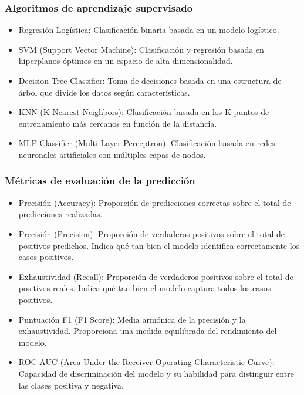 \documentclass{beamer}
\begin{document}
\begin{frame}
	\frametitle{Algoritmos de aprendizaje supervisado}
	
	\begin{itemize}
		\item Regresión Logística: Clasificación binaria basada en un modelo logístico.
		\item SVM (Support Vector Machine): Clasificación y regresión basada en hiperplanos óptimos en un espacio de alta dimensionalidad.
		\item Decision Tree Classifier: Toma de decisiones basada en una estructura de árbol que divide los datos según características.
		\item KNN (K-Nearest Neighbors): Clasificación basada en los K puntos de entrenamiento más cercanos en función de la distancia.
		\item MLP Classifier (Multi-Layer Perceptron): Clasificación basada en redes neuronales artificiales con múltiples capas de nodos.
	\end{itemize}
	
\end{frame}


\begin{frame}
	\frametitle{Métricas de evaluación de la predicción}
	\begin{itemize}
		\item Precisión (Accuracy): Proporción de predicciones correctas sobre el total de predicciones realizadas.
		\item Precisión (Precision): Proporción de verdaderos positivos sobre el total de positivos predichos. Indica qué tan bien el modelo identifica correctamente los casos positivos.
		\item Exhaustividad (Recall): Proporción de verdaderos positivos sobre el total de positivos reales. Indica qué tan bien el modelo captura todos los casos positivos.
		\item Puntuación F1 (F1 Score): Media armónica de la precisión y la exhaustividad. Proporciona una medida equilibrada del rendimiento del modelo.
		\item ROC AUC (Area Under the Receiver Operating Characteristic Curve): Capacidad de discriminación del modelo y su habilidad para distinguir entre las clases positiva y negativa.
	\end{itemize}
	
\end{frame}
\end{document}
